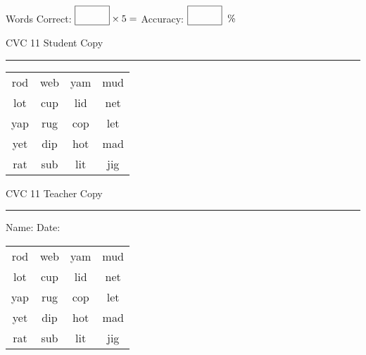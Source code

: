 \documentclass{memoir}
\begin{document}
\small

Words Correct: $\fbox{\phantom{\huge 100}} \times 5 = $ Accuracy: $\fbox{\phantom{\huge 100}}\;\; \%$ 

\vfill

\newpage


\footnotesize \noindent
CVC 11 \hfill Student Copy
\smallskip
\hrule

\Large

\setlength{\tabcolsep}{14pt}
\def\arraystretch{2}

{\selectfont


\begin{vplace}[0.5]
\begin{center}
\begin{tabular}{cccc}
rod & web & yam & mud \\
lot & cup & lid & net \\
yap & rug & cop & let \\
yet & dip & hot & mad \\
rat & sub & lit & jig \\
\end{tabular}
\end{center}
\end{vplace}

}

\newpage

\footnotesize \noindent
CVC 11 \hfill Teacher Copy
\smallskip
\hrule

\small

\vfill

\noindent
Name: \underline{\hspace{1.75in}} \hfill Date: \underline{\hspace{1in}}

\Large

{\selectfont


\begin{vplace}[0.5]
\begin{center}
\begin{tabular}{cccc}
rod & web & yam & mud \\
lot & cup & lid & net \\
yap & rug & cop & let \\
yet & dip & hot & mad \\
rat & sub & lit & jig \\
\end{tabular}
\end{center}
\end{vplace}



}
\end{document}
